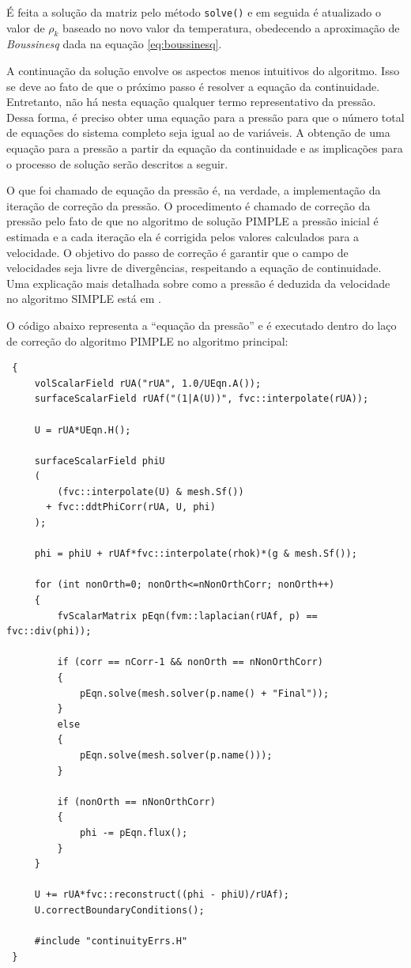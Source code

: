 \documentclass[12pt,openright,twoside,a4paper,english,french,spanish,brazil]{abntex2}
\begin{document}
É feita a solução da matriz pelo método \texttt{solve()} e em seguida é atualizado o 
valor de $\rho_k$ baseado no novo valor da temperatura, obedecendo a aproximação 
de \textit{Boussinesq} dada na equação \ref{eq:boussinesq}.

A continuação da solução envolve os aspectos menos intuitivos do algoritmo. Isso se deve 
ao fato de que o próximo passo é resolver a equação da continuidade. Entretanto, não há 
nesta equação qualquer termo representativo da pressão. Dessa forma, é preciso obter uma 
equação para a pressão para que o número total de equações do sistema completo seja 
igual ao de variáveis. A obtenção de uma equação para a pressão a partir da equação da continuidade 
e as implicações para o processo de solução serão descritos a seguir.

O que foi chamado de equação da pressão é, na verdade, a implementação da iteração de correção 
da pressão. O procedimento é chamado de correção da pressão pelo fato de que no algoritmo 
de solução PIMPLE a pressão inicial é estimada e a cada iteração ela é corrigida pelos 
valores calculados para a velocidade. O objetivo do passo de correção é garantir que o campo 
de velocidades seja livre de divergências, respeitando a equação de continuidade. Uma explicação mais detalhada sobre como 
a pressão é deduzida da velocidade no algoritmo SIMPLE está em \cite[p.~187]{Versteeg2007}.

O código abaixo representa a ``equação da pressão'' e é executado dentro do laço de correção 
do algoritmo PIMPLE no algoritmo principal:

\begin{verbatim}
 {
     volScalarField rUA("rUA", 1.0/UEqn.A());
     surfaceScalarField rUAf("(1|A(U))", fvc::interpolate(rUA));
 
     U = rUA*UEqn.H();
 
     surfaceScalarField phiU
     (
         (fvc::interpolate(U) & mesh.Sf())
       + fvc::ddtPhiCorr(rUA, U, phi)
     );
 
     phi = phiU + rUAf*fvc::interpolate(rhok)*(g & mesh.Sf());
 
     for (int nonOrth=0; nonOrth<=nNonOrthCorr; nonOrth++)
     {
         fvScalarMatrix pEqn(fvm::laplacian(rUAf, p) == fvc::div(phi));
 
         if (corr == nCorr-1 && nonOrth == nNonOrthCorr)
         {
             pEqn.solve(mesh.solver(p.name() + "Final"));
         }
         else
         {
             pEqn.solve(mesh.solver(p.name()));
         }
 
         if (nonOrth == nNonOrthCorr)
         {
             phi -= pEqn.flux();
         }
     }
 
     U += rUA*fvc::reconstruct((phi - phiU)/rUAf);
     U.correctBoundaryConditions();
 
     #include "continuityErrs.H"
 }
\end{verbatim}
\end{document}
